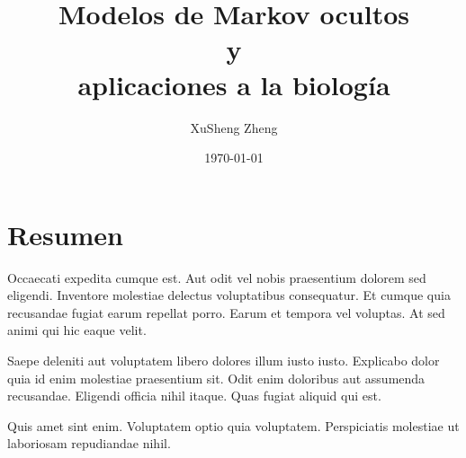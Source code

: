 \documentclass[twoside,openright,titlepage,numbers=noenddot,headinclude,footinclude=true,
cleardoublepage=empty,abstract=false,BCOR=5mm,paper=a4,fontsize=12pt,main=spanish,pdfstartpage=1]{scrreprt}
\author{XuSheng Zheng}
\date{\today}
\title{Modelos de Markov ocultos\\ y \\aplicaciones a la biología}
\begin{document}
\maketitle
\tableofcontents


\chapter*{Resumen}


Occaecati expedita cumque est. Aut odit vel nobis praesentium dolorem
sed eligendi. Inventore molestiae delectus voluptatibus
consequatur. Et cumque quia recusandae fugiat earum repellat
porro. Earum et tempora vel voluptas. At sed animi qui hic eaque
velit.

Saepe deleniti aut voluptatem libero dolores illum iusto
iusto. Explicabo dolor quia id enim molestiae praesentium sit. Odit
enim doloribus aut assumenda recusandae. Eligendi officia nihil
itaque. Quas fugiat aliquid qui est.

Quis amet sint enim. Voluptatem optio quia voluptatem. Perspiciatis
molestiae ut laboriosam repudiandae nihil.










{}
   
\end{document}
